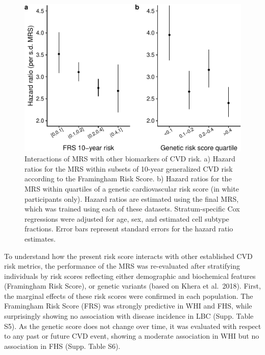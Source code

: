 \documentclass[]{article}
\begin{document}
\begin{figure}
\centering
\includegraphics{figures/aggregate-interactions-1.pdf}
\caption{Interactions of MRS with other biomarkers of CVD risk. a)
Hazard ratios for the MRS within subsets of 10-year generalized CVD risk
according to the Framingham Risk Score. b) Hazard ratios for the MRS
within quartiles of a genetic cardiovascular risk score (in white
participants only). Hazard ratios are estimated using the final MRS,
which was trained using each of these datasets. Stratum-specific Cox
regressions were adjusted for age, sex, and estimated cell subtype
fractions. Error bars represent standard errors for the hazard ratio
estimates.}
\end{figure}

To understand how the present risk score interacts with other
established CVD risk metrics, the performance of the MRS was
re-evaluated after stratifying individuals by risk scores reflecting
either demographic and biochemical features (Framingham Risk Score), or
genetic variants (based on Khera et al.~2018). First, the marginal
effects of these risk scores were confirmed in each population. The
Framingham Risk Score (FRS) was strongly predictive in WHI and FHS,
while surprisingly showing no association with disease incidence in LBC
(Supp. Table S5). As the genetic score does not change over time, it was
evaluated with respect to any past or future CVD event, showing a
moderate association in WHI but no association in FHS (Supp. Table S6).
\end{document}
